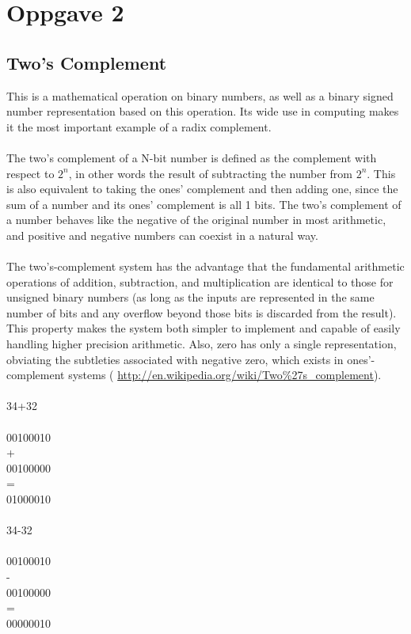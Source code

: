 \documentclass[a4paper]{article}
\begin{document}
\section*{Oppgave 2}{
  \subsection*{Two's Complement}{
    This is a mathematical operation on binary numbers, as well as a binary signed number representation based on this operation. Its wide use in computing makes it the most important example of a radix complement.\\\\
    The two's complement of a N-bit number is defined as the complement with respect to $2^n$, in other words the result of subtracting the number from $2^n$. This is also equivalent to taking the ones' complement and then adding one, since the sum of a number and its ones' complement is all 1 bits. The two's complement of a number behaves like the negative of the original number in most arithmetic, and positive and negative numbers can coexist in a natural way.\\\\
    The two's-complement system has the advantage that the fundamental arithmetic operations of addition, subtraction, and multiplication are identical to those for unsigned binary numbers (as long as the inputs are represented in the same number of bits and any overflow beyond those bits is discarded from the result). This property makes the system both simpler to implement and capable of easily handling higher precision arithmetic. Also, zero has only a single representation, obviating the subtleties associated with negative zero, which exists in ones'-complement systems (
    \url{http://en.wikipedia.org/wiki/Two%27s_complement}).\\\\
34+32\\\\00100010\\+\\00100000\\=\\01000010\\\\
34-32\\\\00100010\\-\\00100000\\=\\00000010\\\\
}}
\end{document}
